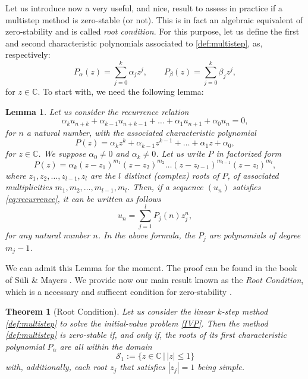 \documentclass{article}
\newtheorem{theorem}{Theorem}
\newtheorem{lemma}{Lemma}
\begin{document}
Let us introduce now a very useful, and nice, result to assess in practice if a multistep method is zero-stable (or not). This is in fact an algebraic equivalent of zero-stability and is called \emph{root condition}. For this purpose, let us define the first and second characteristic polynomials associated to \eqref{def:multistep}, as, respectively:
\[
P_\alpha(z) = \sum_{j=0}^k \alpha_j z^j, \qquad P_\beta(z) = \sum_{j=0}^k \beta_j z^j,
\]
for $z\in\mathbb{C}$.
To start with, we need the following lemma:
\begin{lemma} \label{lemma:zero_stab}
Let us consider the recurrence relation
\begin{equation} \label{eq:recurrence}
\alpha_k u_{n+k} + \alpha_{k-1} u_{n+k-1} + \ldots + \alpha_1 u_{n+1} + \alpha_0 u_n = 0,    
\end{equation}
for $n$ a natural number, with the associated \emph{characteristic polynomial}
\[
P(z) = \alpha_k z^k + \alpha_{k-1} z^{k-1} + \ldots + \alpha_1 z + \alpha_0,
\]
for $z\in\mathbb{C}$. We suppose $\alpha_0 \neq 0$ and $\alpha_k \neq 0$. Let us write $P$ in factorized form
\[
P(z) = \alpha_k ( z - z_1 )^{m_1} ( z - z_2 )^{m_2} \ldots ( z - z_{l-1} )^{m_{l-1}} ( z - z_l )^{m_l},
\]
where $z_1, z_2, \ldots, z_{l-1}, z_{l}$ are the $l$ distinct (complex) roots of $P$, of associated multiplicities $m_1,m_2,\ldots,m_{l-1},m_l$. Then, if a sequence $(u_n)$ satisfies \eqref{eq:recurrence}, it can be written as follows
\begin{equation} \label{eq:recurrence2}
    u_n = \sum_{j=1}^l P_j(n) z_j^n,
\end{equation}
for any natural number $n$. In the above formula, the $P_j$ are polynomials of degree $m_j-1$.
\end{lemma}
We can admit this Lemma for the moment. The proof can be found in the book of S\"uli \& Mayers \cite[Lemma 12.1]{suli03}. %
We provide now our main result known as the \emph{Root Condition}, which is a necessary and sufficent condition for zero-stability \cite{suli03}.

\begin{theorem}[Root Condition] \label{thm:root_condition} Let us consider the linear $k$-step method \eqref{def:multistep} to solve the initial-value problem \eqref{IVP}. Then the method \eqref{def:multistep} is zero-stable if, and only if, the roots of its first characteristic polynomial $P_\alpha$ are all within the domain
\[
\mathcal{S}_1 := \{ z\in\mathbb{C} \,|\, |z|\leq 1 \}
\]
with, additionally, each root $z_j$ that satisfies $|z_j|=1$ being simple. 
\end{theorem}
\end{document}

